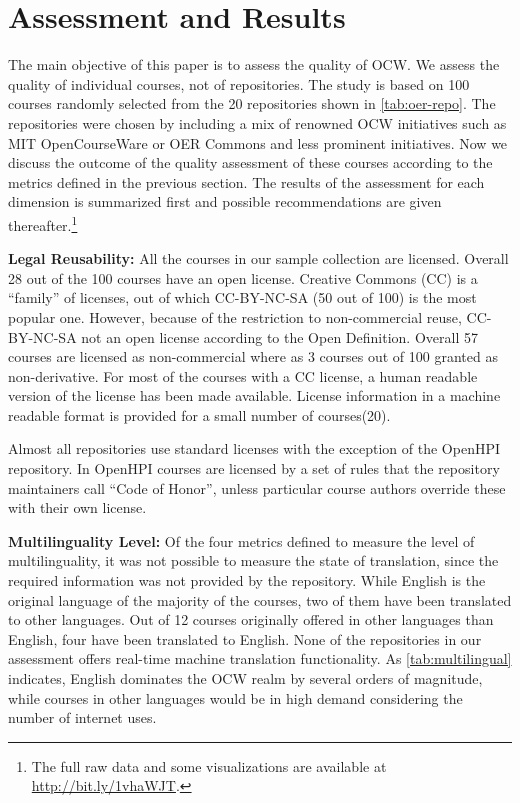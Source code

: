 \documentclass{sig-alternate}
\let\ednote\Ednote
\theoremstyle{definition}
\begin{document}
\noindent\section{Assessment and Results}
\label{sec:assessment-results}
The main objective of this paper is to assess the quality of OCW.
We assess the quality of individual courses, not of repositories.
The study is based on 100 courses randomly selected from the 20 repositories shown in \autoref{tab:oer-repo}.
The repositories were chosen by including a mix of renowned OCW initiatives such as MIT OpenCourseWare or OER Commons and less prominent initiatives.
Now we discuss the outcome of the quality assessment of these courses according to the metrics defined in the previous section.
The results of the assessment for each dimension is summarized first and possible recommendations are given thereafter.\footnote{The full raw data and some visualizations are available at \url{http://bit.ly/1vhaWJT}.}

\noindent\textbf{Legal Reusability:}
All the courses in our sample collection are licensed.
Overall 28 out of the 100 courses have an open license.
Creative Commons (CC) is a ``family'' of licenses, out of which CC-BY-NC-SA (50 out of 100) is the most popular one.
However, because of the restriction to non-commercial reuse, CC-BY-NC-SA not an open license according to the Open Definition.
Overall 57 courses are licensed as non-commercial where as 3 courses out of 100 granted as non-derivative.
For most of the courses with a CC license, a human readable version of the license has been made available. 
License information in a machine readable format is provided for a small number of courses(20).

Almost all repositories use standard licenses with the exception of the OpenHPI repository.
In OpenHPI courses are licensed by a set of rules that the repository maintainers call ``Code of Honor'', unless particular course authors override these with their own license.

\noindent\textbf{Multilinguality Level:}
Of the four metrics defined to measure the level of multilinguality, it was not possible to measure \ednote{refer to the metric}the state of translation, since the required information was not provided by the repository.
While English is the original language of the majority of the courses, two of them have been translated to other languages.
Out of 12 courses originally offered in other languages than English, four have been translated to English.
None of the repositories in our assessment offers real-time machine translation functionality.
As \autoref{tab:multilingual} indicates, English dominates the OCW realm by several orders of magnitude, while courses in other languages would be in high demand considering the number of internet uses.
\end{document}
